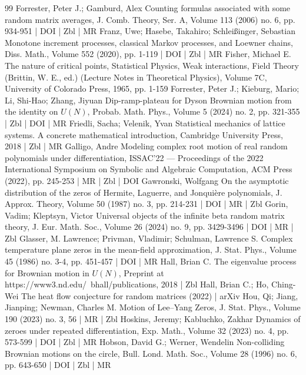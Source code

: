 \documentclass[10pt]{amsart}
\theoremstyle{definition}\newtheorem{defi}[theo]{Definition}\newtheorem{rema}[theo]{Remark}\newtheorem{exam}[theo]{Example}\newtheorem{exem}[theo]{Example}\newtheorem{nota}[theo]{Notation}
\begin{document}
\begin{thebibliography}{99}
Forrester, Peter J.; Gamburd, Alex Counting formulas associated with some random matrix averages, J. Comb. Theory, Ser. A, Volume 113 (2006) no. 6, pp. 934-951 | DOI | Zbl | MR
Franz, Uwe; Hasebe, Takahiro; Schleißinger, Sebastian Monotone increment processes, classical Markov processes, and Loewner chains, Diss. Math., Volume 552 (2020), pp. 1-119 | DOI | Zbl | MR
Fisher, Michael E. The nature of critical points, Statistical Physics, Weak interactions, Field Theory (Brittin, W. E., ed.) (Lecture Notes in Theoretical Physics), Volume 7C, University of Colorado Press, 1965, pp. 1-159
Forrester, Peter J.; Kieburg, Mario; Li, Shi-Hao; Zhang, Jiyuan Dip-ramp-plateau for Dyson Brownian motion from the identity on ${U}({N})$, Probab. Math. Phys., Volume 5 (2024) no. 2, pp. 321-355 | Zbl | DOI | MR
Friedli, Sacha; Velenik, Yvan Statistical mechanics of lattice systems. A concrete mathematical introduction, Cambridge University Press, 2018 | Zbl | MR
Galligo, Andre Modeling complex root motion of real random polynomials under differentiation, ISSAC’22 — Proceedings of the 2022 International Symposium on Symbolic and Algebraic Computation, ACM Press (2022), pp. 245-253 | MR | Zbl | DOI
Gawronski, Wolfgang On the asymptotic distribution of the zeros of Hermite, Laguerre, and Jonquière polynomials, J. Approx. Theory, Volume 50 (1987) no. 3, pp. 214-231 | DOI | MR | Zbl
Gorin, Vadim; Kleptsyn, Victor Universal objects of the infinite beta random matrix theory, J. Eur. Math. Soc., Volume 26 (2024) no. 9, pp. 3429-3496 | DOI | MR | Zbl
Glasser, M. Lawrence; Privman, Vladimir; Schulman, Lawrence S. Complex temperature plane zeros in the mean-field approximation, J. Stat. Phys., Volume 45 (1986) no. 3-4, pp. 451-457 | DOI | MR
Hall, Brian C. The eigenvalue process for Brownian motion in ${U}({N})$, Preprint at https://www3.nd.edu/~bhall/publications, 2018 | Zbl
Hall, Brian C.; Ho, Ching-Wei The heat flow conjecture for random matrices (2022) | arXiv
Hou, Qi; Jiang, Jianping; Newman, Charles M. Motion of Lee–Yang Zeros, J. Stat. Phys., Volume 190 (2023) no. 3, 56 | MR | Zbl
Hoskins, Jeremy; Kabluchko, Zakhar Dynamics of zeroes under repeated differentiation, Exp. Math., Volume 32 (2023) no. 4, pp. 573-599 | DOI | Zbl | MR
Hobson, David G.; Werner, Wendelin Non-colliding Brownian motions on the circle, Bull. Lond. Math. Soc., Volume 28 (1996) no. 6, pp. 643-650 | DOI | Zbl | MR

\end{thebibliography}
\end{document}
